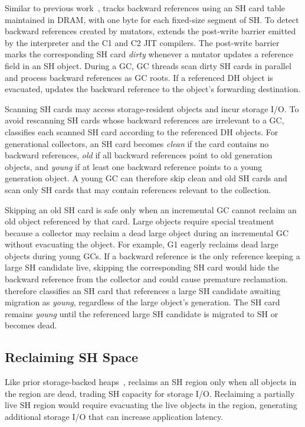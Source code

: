 Similar to previous work~\cite{teraheap,kolokasis:teraheap_toplas}, \chipperName{} tracks backward references using an SH card table maintained in DRAM, with one byte for each fixed-size segment of SH.
To detect backward references created by mutators, \chipperName{} extends the post-write barrier emitted by the interpreter and the C1 and C2 JIT compilers.
The post-write barrier marks the corresponding SH card \emph{dirty} whenever a mutator updates a reference field in an SH object.
During a GC, GC threads scan dirty SH cards in parallel and process backward references as GC roots.
If a referenced DH object is evacuated, \chipperName{} updates the backward reference to the object's forwarding destination.

Scanning SH cards may access storage-resident objects and incur storage I/O.
To avoid rescanning SH cards whose backward references are irrelevant to a GC, \chipperName{} classifies each scanned SH card according to the referenced DH objects.
For generational collectors, an SH card becomes \emph{clean} if the card contains no backward references, \emph{old} if all backward references point to old generation objects, and \emph{young} if at least one backward reference points to a young generation object.
A young GC can therefore skip clean and old SH cards and scan only SH cards that may contain references relevant to the collection.

Skipping an old SH card is safe only when an incremental GC cannot reclaim an old object referenced by that card.
Large objects require special treatment because a collector may reclaim a dead large object during an incremental GC without evacuating the object.
For example, G1 eagerly reclaims dead large objects during young GCs.
If a backward reference is the only reference keeping a large SH candidate live, skipping the corresponding SH card would hide the backward reference from the collector and could cause premature reclamation.
\chipperName{} therefore classifies an SH card that references a large SH candidate awaiting migration as \emph{young}, regardless of the large object's generation.
The SH card remains \emph{young} until the referenced large SH candidate is migrated to SH or becomes dead.

\subsection{Reclaiming SH Space}
\label{sec:sh-reclaim}

Like prior storage-backed heaps~\cite{leaksurvivor,teraheap}, \chipperName{} reclaims an SH region only when all objects in the region are dead, trading SH capacity for storage I/O.
Reclaiming a partially live SH region would require evacuating the live objects in the region, generating additional storage I/O that can increase application latency.

